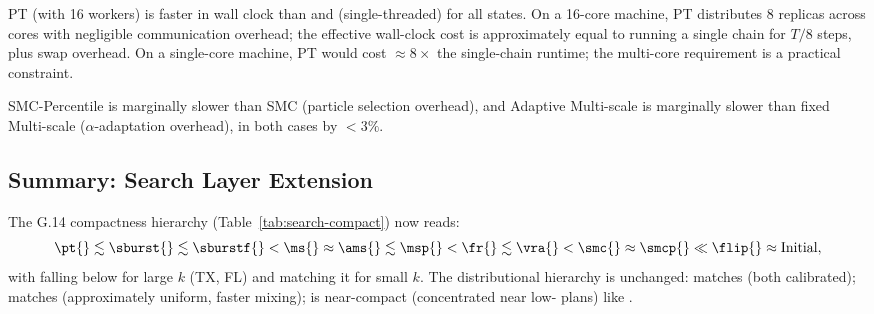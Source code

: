 PT (with 16 workers) is faster in wall clock than \sburst{} and
\sburstf{} (single-threaded) for all states.
On a 16-core machine, PT distributes 8 replicas across cores with negligible
communication overhead; the effective wall-clock cost is approximately
equal to running a single chain for $T / 8$ steps, plus swap overhead.
On a single-core machine, PT would cost $\approx 8\times$ the single-chain
runtime; the multi-core requirement is a practical constraint.

SMC-Percentile is marginally slower than SMC (particle selection overhead),
and Adaptive Multi-scale is marginally slower than fixed Multi-scale
($\alpha$-adaptation overhead), in both cases by $< 3\%$.

\subsection{Summary: Search Layer Extension}

The G.14 compactness hierarchy (Table~\ref{tab:search-compact}) now reads:
\[
  \pt{} \lesssim \sburst{} \lesssim \sburstf{} < \ms{} \approx \ams{}
  \lesssim \msp{} < \fr{} \lesssim \vra{} < \smc{} \approx \smcp{}
  \ll \flip{} \approx \text{Initial},
\]
with \pt{} falling below \sburst{} for large $k$ (TX, FL) and matching it
for small $k$.
The distributional hierarchy is unchanged: \smcp{} matches \smc{} (both
calibrated); \ams{} matches \ms{} (approximately uniform, faster mixing);
\pt{} is near-compact (concentrated near low-\ec{} plans) like \sburst{}.
